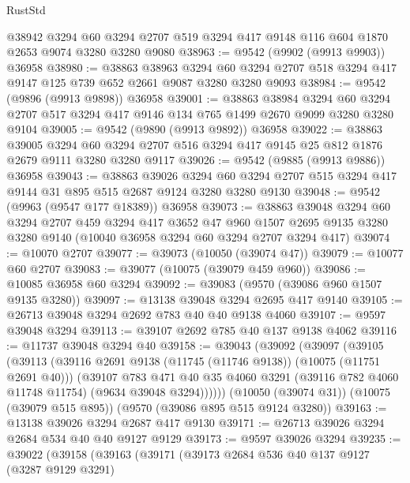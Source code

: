 \begin{lexlean}{RustStd}
\begin{coremodule}
    @38942
    @3294
    @60
    @3294
    @2707
    @519
    @3294
    @417
    @9148
    @116
    @604
    @1870
    @2653
    @9074
    @3280
    @3280
    @9080
@38963 := @9542 (@9902 (@9913 @9903)) @36958
@38980 := @38863
    @38963
    @3294
    @60
    @3294
    @2707
    @518
    @3294
    @417
    @9147
    @125
    @739
    @652
    @2661
    @9087
    @3280
    @3280
    @9093
@38984 := @9542 (@9896 (@9913 @9898)) @36958
@39001 := @38863
    @38984
    @3294
    @60
    @3294
    @2707
    @517
    @3294
    @417
    @9146
    @134
    @765
    @1499
    @2670
    @9099
    @3280
    @3280
    @9104
@39005 := @9542 (@9890 (@9913 @9892)) @36958
@39022 := @38863
    @39005
    @3294
    @60
    @3294
    @2707
    @516
    @3294
    @417
    @9145
    @25
    @812
    @1876
    @2679
    @9111
    @3280
    @3280
    @9117
@39026 := @9542 (@9885 (@9913 @9886)) @36958
@39043 := @38863
    @39026
    @3294
    @60
    @3294
    @2707
    @515
    @3294
    @417
    @9144
    @31
    @895
    @515
    @2687
    @9124
    @3280
    @3280
    @9130
@39048 := @9542 (@9963 (@9547 @177 @18389)) @36958
@39073 := @38863
    @39048
    @3294
    @60
    @3294
    @2707
    @459
    @3294
    @417
    @3652
    @47
    @960
    @1507
    @2695
    @9135
    @3280
    @3280
    @9140
    (@10040 @36958 @3294 @60 @3294 @2707 @3294 @417)
@39074 := @10070 @2707
@39077 := @39073 (@10050 (@39074 @47))
@39079 := @10077 @60 @2707
@39083 := @39077 (@10075 (@39079 @459 @960))
@39086 := @10085 @36958 @60 @3294
@39092 := @39083 (@9570 (@39086 @960 @1507 @9135 @3280))
@39097 := @13138 @39048 @3294 @2695 @417 @9140
@39105 := @26713 @39048 @3294 @2692 @783 @40 @40 @9138 @4060
@39107 := @9597 @39048 @3294
@39113 := @39107 @2692 @785 @40 @137 @9138 @4062
@39116 := @11737 @39048 @3294 @40
@39158 := @39043
    (@39092
      (@39097
        (@39105
          (@39113
            (@39116 @2691 @9138 (@11745 (@11746 @9138)) (@10075 (@11751 @2691 @40)))
            (@39107
              @783
              @471
              @40
              @35
              @4060
              @3291
              (@39116 @782 @4060 @11748 @11754)
              (@9634 @39048 @3294))))))
    (@10050 (@39074 @31))
    (@10075 (@39079 @515 @895))
    (@9570 (@39086 @895 @515 @9124 @3280))
@39163 := @13138 @39026 @3294 @2687 @417 @9130
@39171 := @26713 @39026 @3294 @2684 @534 @40 @40 @9127 @9129
@39173 := @9597 @39026 @3294
@39235 := @39022
    (@39158
      (@39163
        (@39171
          (@39173
            @2684
            @536
            @40
            @137
            @9127
            (@3287 @9129 @3291)

\end{coremodule}
\end{lexlean}
